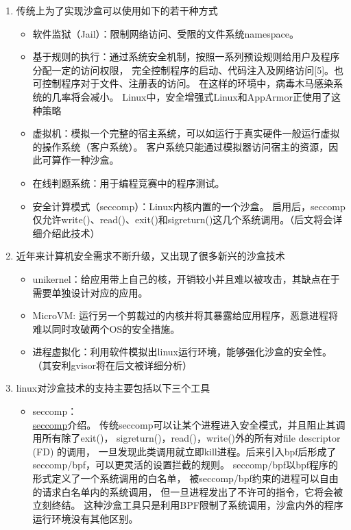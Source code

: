 \documentclass[AutoFakeBold,a4paper]{ctexart}
\begin{document}
\begin{enumerate}

\item 传统上为了实现沙盒可以使用如下的若干种方式
\begin{itemize}
    \item 软件监狱（Jail）：限制网络访问、受限的文件系统namespace。
    \item 基于规则的执行：通过系统安全机制，按照一系列预设规则给用户及程序分配一定的访问权限，
    完全控制程序的启动、代码注入及网络访问[5]。也可控制程序对于文件、注册表的访问。
    在这样的环境中，病毒木马感染系统的几率将会减小。
    Linux中，安全增强式Linux和AppArmor正使用了这种策略
    \item 虚拟机：模拟一个完整的宿主系统，可以如运行于真实硬件一般运行虚拟的操作系统（客户系统）。
    客户系统只能通过模拟器访问宿主的资源，因此可算作一种沙盒。
    \item 在线判题系统：用于编程竞赛中的程序测试。
    \item 安全计算模式（seccomp）：Linux内核内置的一个沙盒。
    启用后，seccomp仅允许write()、read()、exit()和sigreturn()这几个系统调用。（后文将会详细介绍此技术）

\end{itemize}

\item 近年来计算机安全需求不断升级，又出现了很多新兴的沙盒技术
\begin{itemize}
    \item unikernel：给应用带上自己的核，开销较小并且难以被攻击，其缺点在于需要单独设计对应的应用。
    \item MicroVM: 运行另一个剪裁过的内核并将其暴露给应用程序，恶意进程将难以同时攻破两个OS的安全措施。
    \item 进程虚拟化：利用软件模拟出linux运行环境，能够强化沙盒的安全性。（其安利gvisor将在后文被详细分析）
\end{itemize}

\item linux对沙盒技术的支持主要包括以下三个工具
\begin{itemize}
    \item seccomp：\\
    \href{https://en.wikipedia.org/wiki/Seccomp}{seccomp}介绍。
    传统seccomp可以让某个进程进入安全模式，并且阻止其调用所有除了exit()，
    sigreturn()，read()，write()外的所有对file descriptor (FD) 的调用，
    一旦发现此类调用就立即kill进程。后来引入bpf后形成了seccomp/bpf，可以更灵活的设置拦截的规则。
    seccomp/bpf以bpf程序的形式定义了一个系统调用的白名单，
    被seccomp/bpf约束的进程可以自由的请求白名单内的系统调用，
    但一旦进程发出了不许可的指令，它将会被立刻终结。
    这种沙盒工具只是利用BPF限制了系统调用，沙盒内外的程序运行环境没有其他区别。
    \cite{2020SandboxLinux}


\end{itemize}
\end{enumerate}
\end{document}
